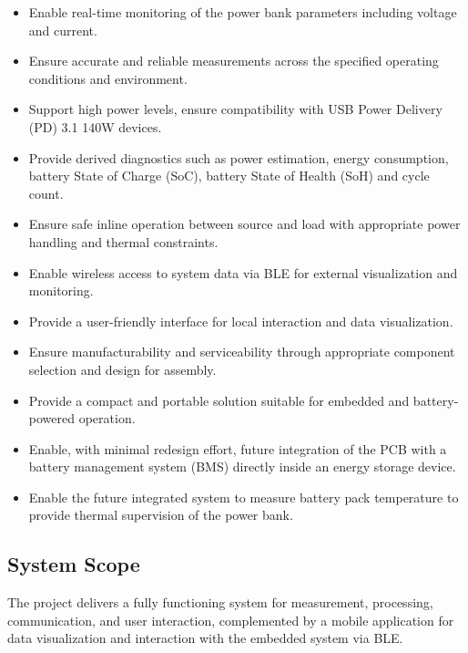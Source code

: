 \begin{itemize}
    \item Enable real-time monitoring of the power bank parameters including voltage and current.
    
    \item Ensure accurate and reliable measurements across the specified operating conditions and environment.
    
    \item Support high power levels, ensure compatibility with USB Power Delivery (PD) 3.1 140W devices.
    
    \item Provide derived diagnostics such as power estimation, energy consumption, battery State of Charge (SoC), battery State of Health (SoH) and cycle count.

    \item Ensure safe inline operation between source and load with appropriate power handling and thermal constraints.

    \item Enable wireless access to system data via BLE for external visualization and monitoring.
    
    \item Provide a user-friendly interface for local interaction and data visualization.
    
    \item Ensure manufacturability and serviceability through appropriate component selection and design for assembly.

    \item Provide a compact and portable solution suitable for embedded and battery-powered operation.
    
    \item Enable, with minimal redesign effort, future integration of the PCB with a battery management system (BMS) directly inside an energy storage device.
    
    \item Enable the future integrated system to measure battery pack temperature to provide thermal supervision of the power bank.

\end{itemize}

\subsection{System Scope}

The project delivers a fully functioning system for measurement, processing, communication, and user interaction, complemented by a mobile application for data visualization and interaction with the embedded system via BLE.

